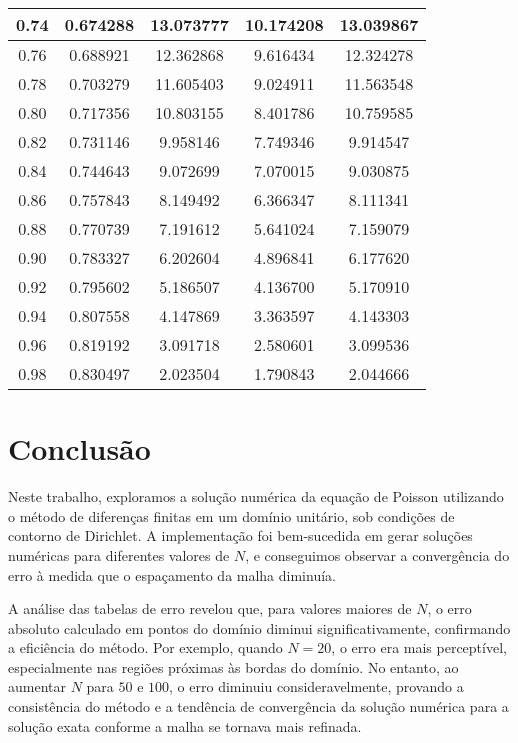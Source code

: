 \documentclass[column,amsmath,amssymb,floatfix]{revtex4}
\begin{document}
\begin{enumerate}
\begin{enumerate}
\begin{table}[H]
\begin{tabular}{|c|c|c|c|c|}
                        0.74 & 0.674288 & 13.073777 & 10.174208 & 13.039867 \\ \hline
                        0.76 & 0.688921 & 12.362868 & 9.616434 & 12.324278 \\ \hline
                        0.78 & 0.703279 & 11.605403 & 9.024911 & 11.563548 \\ \hline
                        0.80 & 0.717356 & 10.803155 & 8.401786 & 10.759585 \\ \hline
                        0.82 & 0.731146 & 9.958146 & 7.749346 & 9.914547 \\ \hline
                        0.84 & 0.744643 & 9.072699 & 7.070015 & 9.030875 \\ \hline
                        0.86 & 0.757843 & 8.149492 & 6.366347 & 8.111341 \\ \hline
                        0.88 & 0.770739 & 7.191612 & 5.641024 & 7.159079 \\ \hline
                        0.90 & 0.783327 & 6.202604 & 4.896841 & 6.177620 \\ \hline
                        0.92 & 0.795602 & 5.186507 & 4.136700 & 5.170910 \\ \hline
                        0.94 & 0.807558 & 4.147869 & 3.363597 & 4.143303 \\ \hline
                        0.96 & 0.819192 & 3.091718 & 2.580601 & 3.099536 \\ \hline
                        0.98 & 0.830497 & 2.023504 & 1.790843 & 2.044666 \\ \hline
                    \end{tabular}
                \end{table}
            \end{enumerate}
        \end{enumerate}

    \section{Conclusão}

        Neste trabalho, exploramos a solução numérica da equação de Poisson utilizando o método de diferenças finitas em um domínio unitário, sob condições de contorno de Dirichlet. A implementação foi bem-sucedida em gerar soluções numéricas para diferentes valores de $N$, e conseguimos observar a convergência do erro à medida que o espaçamento da malha diminuía.
        
        A análise das tabelas de erro revelou que, para valores maiores de $N$, o erro absoluto calculado em pontos do domínio diminui significativamente, confirmando a eficiência do método. Por exemplo, quando $N = 20$, o erro era mais perceptível, especialmente nas regiões próximas às bordas do domínio. No entanto, ao aumentar $N$ para $50$ e $100$, o erro diminuiu consideravelmente, provando a consistência do método e a tendência de convergência da solução numérica para a solução exata conforme a malha se tornava mais refinada.
        
\end{document}
